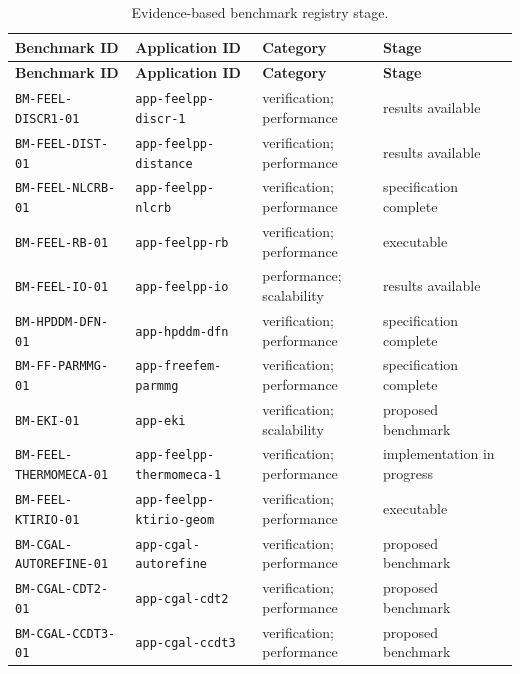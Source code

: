 \begingroup
\footnotesize
\setlength{\tabcolsep}{3pt}
\begin{longtable}{@{}>{\raggedright\arraybackslash}p{}>{\raggedright\arraybackslash}p{}>{\raggedright\arraybackslash}p{}>{\raggedright\arraybackslash}p{}@{}}
\caption{Evidence-based benchmark registry stage.}
\label{tab:v3-benchmark-registry}\\
\toprule
\textbf{Benchmark ID} & \textbf{Application ID} & \textbf{Category} & \textbf{Stage} \\
\midrule
\endfirsthead
\toprule
\textbf{Benchmark ID} & \textbf{Application ID} & \textbf{Category} & \textbf{Stage} \\
\midrule
\endhead
\nolinkurl{BM-FEEL-DISCR1-01} & \nolinkurl{app-feelpp-discr-1} & verification; performance & results available \\
\nolinkurl{BM-FEEL-DIST-01} & \nolinkurl{app-feelpp-distance} & verification; performance & results available \\
\nolinkurl{BM-FEEL-NLCRB-01} & \nolinkurl{app-feelpp-nlcrb} & verification; performance & specification complete \\
\nolinkurl{BM-FEEL-RB-01} & \nolinkurl{app-feelpp-rb} & verification; performance & executable \\
\nolinkurl{BM-FEEL-IO-01} & \nolinkurl{app-feelpp-io} & performance; scalability & results available \\
\nolinkurl{BM-HPDDM-DFN-01} & \nolinkurl{app-hpddm-dfn} & verification; performance & specification complete \\
\nolinkurl{BM-FF-PARMMG-01} & \nolinkurl{app-freefem-parmmg} & verification; performance & specification complete \\
\nolinkurl{BM-EKI-01} & \nolinkurl{app-eki} & verification; scalability & proposed benchmark \\
\nolinkurl{BM-FEEL-THERMOMECA-01} & \nolinkurl{app-feelpp-thermomeca-1} & verification; performance & implementation in progress \\
\nolinkurl{BM-FEEL-KTIRIO-01} & \nolinkurl{app-feelpp-ktirio-geom} & verification; performance & executable \\
\nolinkurl{BM-CGAL-AUTOREFINE-01} & \nolinkurl{app-cgal-autorefine} & verification; performance & proposed benchmark \\
\nolinkurl{BM-CGAL-CDT2-01} & \nolinkurl{app-cgal-cdt2} & verification; performance & proposed benchmark \\
\nolinkurl{BM-CGAL-CCDT3-01} & \nolinkurl{app-cgal-ccdt3} & verification; performance & proposed benchmark \\

\end{longtable}
